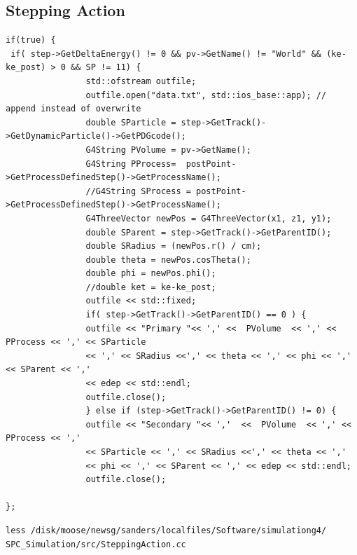 \documentclass[a4paper]{article}
\begin{document}
\subsection{Stepping Action}
\begin{verbatim}
if(true) {
 if( step->GetDeltaEnergy() != 0 && pv->GetName() != "World" && (ke-ke_post) > 0 && SP != 11) {
                std::ofstream outfile;
                outfile.open("data.txt", std::ios_base::app); // append instead of overwrite
                double SParticle = step->GetTrack()->GetDynamicParticle()->GetPDGcode();
                G4String PVolume = pv->GetName();
                G4String PProcess=  postPoint->GetProcessDefinedStep()->GetProcessName();
                //G4String SProcess = postPoint->GetProcessDefinedStep()->GetProcessName();
                G4ThreeVector newPos = G4ThreeVector(x1, z1, y1);
                double SParent = step->GetTrack()->GetParentID();
                double SRadius = (newPos.r() / cm);
                double theta = newPos.cosTheta();
                double phi = newPos.phi();
                //double ket = ke-ke_post;
                outfile << std::fixed;
                if( step->GetTrack()->GetParentID() == 0 ) {
                outfile << "Primary "<< ',' <<  PVolume  << ',' << PProcess << ',' << SParticle  
                << ',' << SRadius <<',' << theta << ',' << phi << ',' << SParent << ',' 
                << edep << std::endl;
                outfile.close();
                } else if (step->GetTrack()->GetParentID() != 0) {
                outfile << "Secondary "<< ','  <<  PVolume  << ',' << PProcess << ',' 
                << SParticle << ',' << SRadius <<',' << theta << ',' 
                << phi << ',' << SParent << ',' << edep << std::endl;
                outfile.close();

};
\end{verbatim}
\begin{verbatim}
less /disk/moose/newsg/sanders/localfiles/Software/simulationg4/
SPC_Simulation/src/SteppingAction.cc
\end{verbatim}
\end{document}
